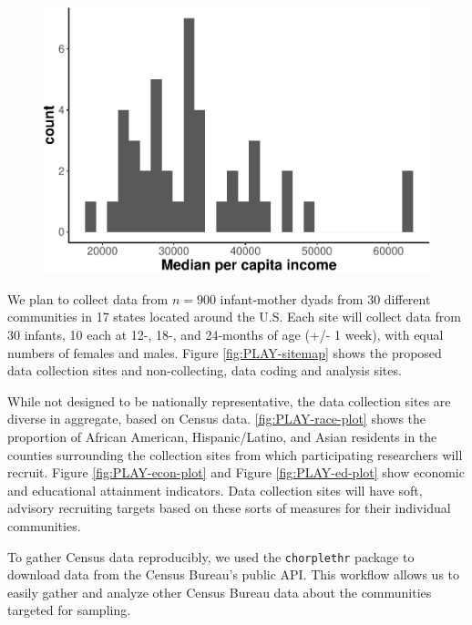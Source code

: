 \documentclass[english,man]{apa6}
\theoremstyle{definition}
\theoremstyle{definition}
\theoremstyle{definition}
\theoremstyle{remark}
\begin{document}
\begin{figure}
\centering
\includegraphics{ibad-ms_files/figure-latex/PLAY-econ-plot-1.pdf}
\caption{}
\end{figure}

We plan to collect data from \(n=900\) infant-mother dyads from 30
different communities in 17 states located around the U.S. Each site
will collect data from 30 infants, 10 each at 12-, 18-, and 24-months of
age (+/- 1 week), with equal numbers of females and males. Figure
\ref{fig:PLAY-sitemap} shows the proposed data collection sites and
non-collecting, data coding and analysis sites.

While not designed to be nationally representative, the data collection
sites are diverse in aggregate, based on Census data.
\ref{fig:PLAY-race-plot} shows the proportion of African American,
Hispanic/Latino, and Asian residents in the counties surrounding the
collection sites from which participating researchers will recruit.
Figure \ref{fig:PLAY-econ-plot} and Figure \ref{fig:PLAY-ed-plot} show
economic and educational attainment indicators. Data collection sites
will have soft, advisory recruiting targets based on these sorts of
measures for their individual communities.

To gather Census data reproducibly, we used the \texttt{chorplethr}
package to download data from the Census Bureau's public API. This
workflow allows us to easily gather and analyze other Census Bureau data
about the communities targeted for sampling.
\end{document}
